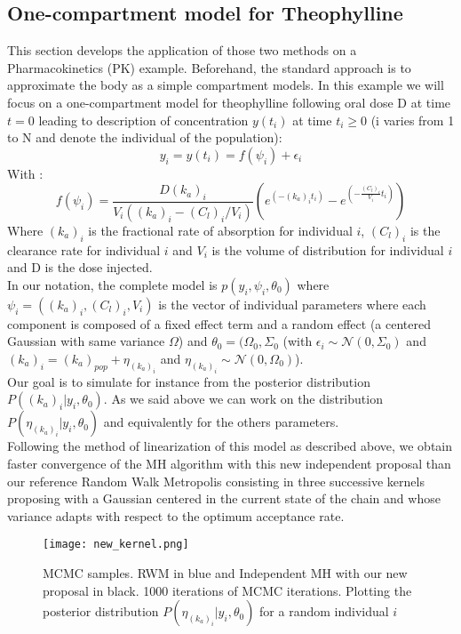 \documentclass{article}
\begin{document}
\subsection{One-compartment model for Theophylline}
This section develops the application of those two methods on a Pharmacokinetics (PK) example. Beforehand, the standard approach is to approximate the body as a simple compartment models. In this example we will focus on a one-compartment model for theophylline following oral dose D at time $t=0$ leading to description of concentration $y(t_i)$ at time $t_i \geq 0$ (i varies from 1 to N and denote the individual of the population):
\begin{equation}
y_i = y(t_i) = f(\psi_i)+ \epsilon_i
\end{equation}
With :
\begin{equation}
f(\psi_i) = \frac{D(k_a)_i}{V_i((k_a)_i - (C_l)_i/V_i)}(e^{(-(k_a)_it_i)}-e^{(-\frac{(C_l)_i}{V_i}t_i)})
\end{equation}
Where $(k_a)_i$ is the fractional rate of absorption for individual $i$, $(C_l)_i$ is the clearance rate for individual $i$ and $V_i$ is the volume of distribution for individual $i$ and D is the dose injected.\\
In our notation, the complete model is $p(y_i,\psi_i,\theta_0)$ where $\psi_i = ((k_a)_i, (C_l)_i, V_i)$ is the vector of individual parameters where each component is composed of a fixed effect term and a random effect (a centered Gaussian with same variance $\Omega$) and $\theta_0 = (\Omega_0, \Sigma_0$ (with $\epsilon_i \sim \mathcal{N}(0,\Sigma_0)$ and $(k_a)_i = (k_a)_{pop} + \eta_{(k_a)_i}$ and $\eta_{(k_a)_i} \sim \mathcal{N}(0,\Omega_0)$).\\
Our goal is to simulate for instance from the posterior distribution $P((k_a)_i|y_i,\theta_0)$. As we said above we can work on the distribution $P(\eta_{(k_a)_i}|y_i,\theta_0)$ and equivalently for the others parameters.\\
Following the method of linearization of this model as described above, we obtain faster convergence of the MH algorithm with this new independent proposal than our reference Random Walk Metropolis consisting in three successive kernels proposing with a Gaussian centered in the current state of the chain and whose variance adapts with respect to the optimum acceptance rate.

\begin{figure}[ht]
\vskip 0.2in
\begin{center}
\centerline{\texttt{[image: new\_kernel.png]}}
\caption{MCMC samples. RWM in blue and Independent MH with our new proposal in black. 1000 iterations of MCMC iterations. Plotting the posterior distribution $P(\eta_{(k_a)_i}|y_i,\theta_0)$ for a random individual $i$}
\label{new}
\end{center}
\vskip -0.2in
\end{figure} 
\end{document}
